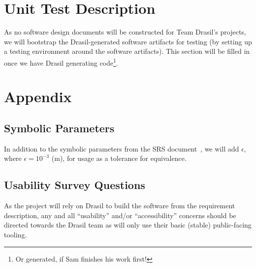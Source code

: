 \documentclass[12pt, titlepage]{article}
\begin{document}
\section{Unit Test Description}
\label{sec:unit_test_description}

As no software design documents will be constructed for Team Drasil's projects,
we will bootstrap the Drasil-generated software artifacts for testing (by
setting up a testing environment around the software artifacts). This section
will be filled in once we have Drasil generating code\footnote{Or generated, if
    Sam finishes his work first!}.


\newpage{}

\printbibliography{}


\newpage{}

\section{Appendix}

\subsection{Symbolic Parameters}

In addition to the symbolic parameters from the SRS
document~\cite{BalaciBeamBendingSRS2023}, we will add \(\epsilon\), where
\(\epsilon = 10^{-3}\) (m), for usage as a tolerance for equivalence.

\subsection{Usability Survey Questions}

As the project will rely on Drasil to build the software from the requirement
description, any and all ``usability'' and/or ``accessibility'' concerns should
be directed towards the Drasil team as \progname{} will only use their basic
(stable) public-facing tooling.
\end{document}
